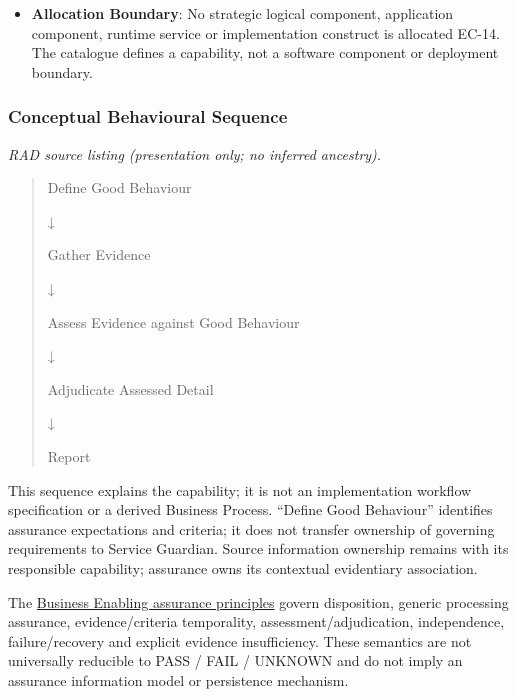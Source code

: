 \begin{itemize}
\item 
\textbf{Allocation Boundary}: No strategic logical component, application component, runtime service or implementation construct is allocated EC-14. The catalogue defines a capability, not a software component or deployment boundary.



\end{itemize}
\label{rad:enterprise:236}
\subsubsection*{Conceptual Behavioural Sequence}
\label{rad:enterprise:238}

\textit{RAD source listing (presentation only; no inferred ancestry).}
\begin{quote}
Define Good Behaviour

↓

Gather Evidence

↓

Assess Evidence against Good Behaviour

↓

Adjudicate Assessed Detail

↓

Report
\end{quote}
\label{rad:enterprise:250}

This sequence explains the capability; it is not an implementation workflow specification or a derived Business Process. “Define Good Behaviour” identifies assurance expectations and criteria; it does not transfer ownership of governing requirements to Service Guardian. Source information ownership remains with its responsible capability; assurance owns its contextual evidentiary association.

\label{rad:enterprise:252}

The \hyperref[rad:enabling:674]{Business Enabling assurance principles} govern disposition, generic processing assurance, evidence/\allowbreak{}criteria temporality, assessment/\allowbreak{}adjudication, independence, failure/\allowbreak{}recovery and explicit evidence insufficiency. These semantics are not universally reducible to PASS /\allowbreak{} FAIL /\allowbreak{} UNKNOWN and do not imply an assurance information model or persistence mechanism.

\label{rad:enterprise:254}

\par\smallskip
{}\label{rad:enterprise:256}
